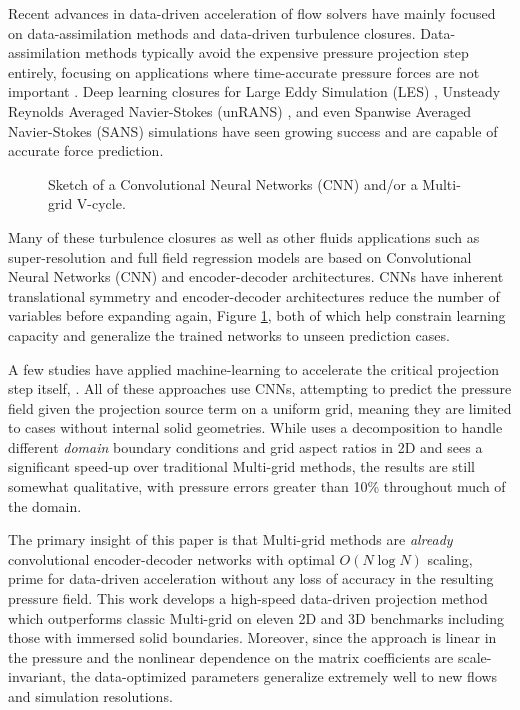\documentclass[review]{elsarticle}
\begin{document}
Recent advances in data-driven acceleration of flow solvers have mainly focused on data-assimilation methods and data-driven turbulence closures. Data-assimilation methods typically avoid the expensive pressure projection step entirely, focusing on applications where time-accurate pressure forces are not important \cite{asch2016data}. Deep learning closures for Large Eddy Simulation (LES) \cite{BECK2019108910,maulik_san_rasheed_vedula_2019}, Unsteady Reynolds Averaged Navier-Stokes (unRANS) \cite{ling_kurzawski_templeton_2016}, and even Spanwise Averaged Navier-Stokes (SANS) \cite{font2021deep} simulations have seen growing success and are capable of accurate force prediction. 

\begin{figure}
    \caption{Sketch of a Convolutional Neural Networks (CNN) and/or a Multi-grid V-cycle.}
    \label{fig:multigrid}
\end{figure}

Many of these turbulence closures as well as other fluids applications such as super-resolution \cite{ferdian20204dflownet,liu2020deep} and full field regression models \cite{duru2021cnnfoil,bhatnagar2019prediction} are based on Convolutional Neural Networks (CNN) and encoder-decoder architectures. CNNs have inherent translational symmetry and encoder-decoder architectures reduce the number of variables before expanding again, Figure \ref{fig:multigrid}, both of which help constrain learning capacity and generalize the trained networks to unseen prediction cases. 

A few studies have applied machine-learning to accelerate the critical projection step itself, \cite{ozbay2021poisson,Xiao2020,ajuria2020}. All of these approaches use CNNs, attempting to predict the pressure field given the projection source term on a uniform grid, meaning they are limited to cases without internal solid geometries. While \cite{ozbay2021poisson} uses a decomposition to handle different \textit{domain} boundary conditions and grid aspect ratios in 2D and sees a significant speed-up over traditional Multi-grid methods, the results are still somewhat qualitative, with pressure errors greater than 10\% throughout much of the domain.

The primary insight of this paper is that Multi-grid methods are \textit{already} convolutional encoder-decoder networks with optimal $O(N\log N)$ scaling, prime for data-driven acceleration without any loss of accuracy in the resulting pressure field. This work develops a high-speed data-driven projection method which outperforms classic Multi-grid on eleven 2D and 3D benchmarks including those with immersed solid boundaries. Moreover, since the approach is linear in the pressure and the nonlinear dependence on the matrix coefficients are scale-invariant, the data-optimized parameters generalize extremely well to new flows and simulation resolutions.
\end{document}
